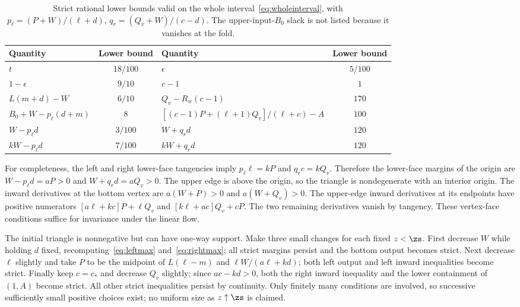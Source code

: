 \begin{table}[ht]
\caption{Strict rational lower bounds valid on the whole interval~\eqref{eq:wholeinterval}, with $p_\ell=(P+W)/(\ell+d)$, $q_r=(Q_v+W)/(c-d)$. The upper-input-$B_0$ slack is not listed because it vanishes at the fold.}\label{tab:margins}
\begin{ruledtabular}
\begin{tabular}{lc@{\qquad}lc}
Quantity & Lower bound & Quantity & Lower bound\\
\hline
$t$ & $18/100$ & $\epsilon$ & $5/100$\\
$1-\epsilon$ & $9/10$ & $c-1$ & $1$\\
$L(m+d)-W$ & $6/10$ & $Q_v-R_w(c-1)$ & $170$\\
$B_0+W-p_\ell(d+m)$ & $8$ & $[(c-1)P+(\ell+1)Q_v]/(\ell+c)-A$ & $100$\\
$W-p_\ell d$ & $3/100$ & $W+q_r d$ & $120$\\
$kW-p_\ell d$ & $7/100$ & $kW+q_r d$ & $120$
\end{tabular}
\end{ruledtabular}
\end{table}

For completeness, the left and right lower-face tangencies imply $p_\ell\ell=kP$ and $q_rc=kQ_v$. Therefore the lower-face margins of the origin are $W-p_\ell d=aP>0$ and $W+q_rd=aQ_v>0$. The upper edge is above the origin, so the triangle is nondegenerate with an interior origin. The inward derivatives at the bottom vertex are $a(W+P)>0$ and $a(W+Q_v)>0$. The upper-edge inward derivatives at its endpoints have positive numerators $[a\ell+kc]P+\ell Q_v$ and $[k\ell+ac]Q_v+cP$. The two remaining derivatives vanish by tangency. These vertex-face conditions suffice for invariance under the linear flow.

The initial triangle is nonnegative but can have one-way support. Make three small changes for each fixed $z<\zs$. First decrease $W$ while holding $d$ fixed, recomputing~\eqref{eq:leftmax} and~\eqref{eq:rightmax}; all strict margins persist and the bottom output becomes strict. Next decrease $\ell$ slightly and take $P$ to be the midpoint of $L(\ell-m)$ and $\ell W/(a\ell+kd)$; both left output and left inward inequalities become strict. Finally keep $c=c_*$ and decrease $Q_v$ slightly; since $ac-kd>0$, both the right inward inequality and the lower containment of $(1,A)$ become strict. All other strict inequalities persist by continuity. Only finitely many conditions are involved, so successive sufficiently small positive choices exist; no uniform size as $z\uparrow\zs$ is claimed.

